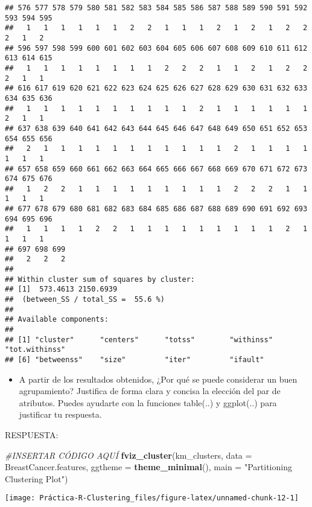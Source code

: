 \documentclass[]{article}
\newenvironment{Shaded}{\begin{snugshade}}{\end{snugshade}}
\newcommand{\CommentTok}[1]{\textcolor[rgb]{0.56,0.35,0.01}{\textit{#1}}}
\newcommand{\DataTypeTok}[1]{\textcolor[rgb]{0.13,0.29,0.53}{#1}}
\newcommand{\KeywordTok}[1]{\textcolor[rgb]{0.13,0.29,0.53}{\textbf{#1}}}
\newcommand{\NormalTok}[1]{#1}
\newcommand{\StringTok}[1]{\textcolor[rgb]{0.31,0.60,0.02}{#1}}
\providecommand{\tightlist}{%
  \setlength{\itemsep}{0pt}\setlength{\parskip}{0pt}}
\begin{document}
\begin{verbatim}
## 576 577 578 579 580 581 582 583 584 585 586 587 588 589 590 591 592 593 594 595 
##   1   1   1   1   1   1   2   2   1   1   1   2   1   2   1   2   2   2   1   2 
## 596 597 598 599 600 601 602 603 604 605 606 607 608 609 610 611 612 613 614 615 
##   1   1   1   1   1   1   1   1   2   2   2   1   1   2   1   2   2   2   1   1 
## 616 617 619 620 621 622 623 624 625 626 627 628 629 630 631 632 633 634 635 636 
##   1   1   1   1   1   1   1   1   1   1   2   1   1   1   1   1   1   2   1   1 
## 637 638 639 640 641 642 643 644 645 646 647 648 649 650 651 652 653 654 655 656 
##   2   1   1   1   1   1   1   1   1   1   1   1   2   1   1   1   1   1   1   1 
## 657 658 659 660 661 662 663 664 665 666 667 668 669 670 671 672 673 674 675 676 
##   1   2   2   1   1   1   1   1   1   1   1   1   2   2   2   1   1   1   1   1 
## 677 678 679 680 681 682 683 684 685 686 687 688 689 690 691 692 693 694 695 696 
##   1   1   1   1   2   2   1   1   1   1   1   1   1   1   1   2   1   1   1   1 
## 697 698 699 
##   2   2   2 
## 
## Within cluster sum of squares by cluster:
## [1]  573.4613 2150.6939
##  (between_SS / total_SS =  55.6 %)
## 
## Available components:
## 
## [1] "cluster"      "centers"      "totss"        "withinss"     "tot.withinss"
## [6] "betweenss"    "size"         "iter"         "ifault"
\end{verbatim}

\begin{itemize}
\tightlist
\item
  A partir de los resultados obtenidos, ¿Por qué se puede considerar un
  buen agrupamiento? Justifica de forma clara y concisa la elección del
  par de atributos. Puedes ayudarte con la funciones table(..) y
  ggplot(..) para justificar tu respuesta.
\end{itemize}

RESPUESTA:

\begin{Shaded}
\begin{Highlighting}[]
\CommentTok{#INSERTAR CÓDIGO AQUÍ}
\KeywordTok{fviz_cluster}\NormalTok{(km_clusters, }\DataTypeTok{data =}\NormalTok{ BreastCancer.features,}
             \DataTypeTok{ggtheme =} \KeywordTok{theme_minimal}\NormalTok{(),}
             \DataTypeTok{main =} \StringTok{"Partitioning Clustering Plot"}\NormalTok{)}
\end{Highlighting}
\end{Shaded}

\begin{center}\texttt{[image: Práctica-R-Clustering\_files/figure-latex/unnamed-chunk-12-1]} \end{center}
\end{document}
